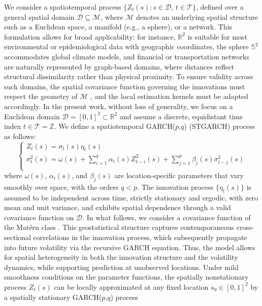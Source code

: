 \documentclass[fleqn,11pt]{article}
\begin{document}
We consider a spatiotemporal process $\{Z_t(s): s \in \mathcal{D},\, t \in \mathcal{T}\}$, defined over a general spatial domain $\mathcal{D} \subseteq \mathcal{M}$, where $\mathcal{M}$ denotes an underlying spatial structure such as a Euclidean space, a manifold (e.g., a sphere), or a network. This formulation allows for broad applicability: for instance, $\mathbb{R}^2$ is suitable for most environmental or epidemiological data with geographic coordinates, the sphere $\mathbb{S}^2$ accommodates global climate models, and financial or transportation networks are naturally represented by graph-based domains, where distances reflect structural dissimilarity rather than physical proximity. To ensure validity across such domains, the spatial covariance function governing the innovations must respect the geometry of $\mathcal{M}$ \citep[see, e.g.,][]{gneiting2010matern, porcu2016spatio, porcu2023stationary}, and the local estimation kernels must be adapted accordingly. In the present work, without loss of generality, we focus on a Euclidean domain $\mathcal{D} = [0,1]^2 \subset \mathbb{R}^2$ and assume a discrete, equidistant time index $t \in  \mathcal{T} = \mathbb{Z}$. We define a spatiotemporal GARCH($p$,$q$) (STGARCH) process as follows:
\begin{equation}\label{eq1}
\begin{cases}
Z_t(s) = \sigma_t(s) \eta_t(s)  \\ 
\sigma_t^2(s) = \omega(s) + \sum_{i=1}^q \alpha_i(s) Z_{t-i}^2(s) + \sum_{j=1}^p \beta_j(s) \sigma_{t-j}^2(s) \\
\end{cases}
\end{equation}
where $\omega(s)$, $\alpha_i(s)$, and $\beta_j(s)$ are location-specific parameters that vary smoothly over space, with the orders $q < p$. The innovation process $\{\eta_t(s)\}$ is assumed to be independent across time, strictly stationary and ergodic, with zero mean and unit variance, and exhibits spatial dependence through a valid covariance function on $\mathcal{D}$. In what follows, we consider a covariance function of the Mat\'{e}rn class \citep{gneiting2010matern}. This geostatistical structure captures contemporaneous cross-sectional correlations in the innovation process, which subsequently propagate into future volatility via the recursive GARCH equation. Thus, the model allows for spatial heterogeneity in both the innovation structure and the volatility dynamics, while supporting prediction at unobserved locations. Under mild smoothness conditions on the parameter functions, the spatially nonstationary process \(Z_t(s)\) can be locally approximated at any fixed location $s_0\in[0,1]^2$ by a spatially stationary GARCH($p$,$q$) process 
\end{document}
